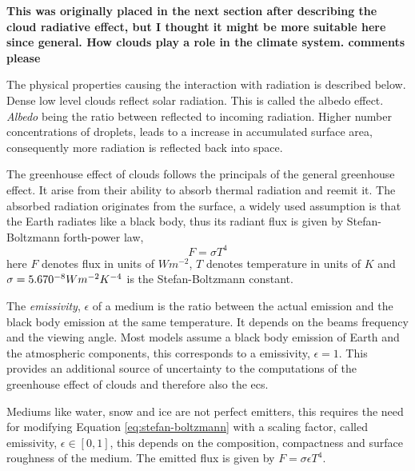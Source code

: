 \textbf{This was originally placed in the next section after describing the cloud radiative effect, but I thought it might be more suitable here since general. How clouds play a role in the climate system. comments please}

The physical properties causing the interaction with radiation is described below. Dense low level clouds reflect solar radiation. This is called the albedo effect. \textit{Albedo} being the ratio between reflected to incoming radiation. Higher number concentrations of droplets, leads to a increase in accumulated surface area, consequently more radiation is reflected back into space. 

The greenhouse effect of clouds follows the  principals of the general greenhouse effect. It arise from their ability to absorb thermal radiation and reemit it. The absorbed radiation originates from the surface, a widely used assumption is that the Earth radiates like a black body, thus its radiant flux is given by Stefan-Boltzmann forth-power law, 
\begin{equation} \label{eq:stefan-boltzmann}
    F = \sigma  T ^4 %
\end{equation}
here $F$ denotes flux in units of $W m^{-2}$, $T$ denotes temperature in units of $K$ and \\  $\sigma = 5.670 \time 10^{-8} W m^{-2} K^{-4}$ is the Stefan-Boltzmann constant. 

The \textit{emissivity}, $\epsilon$ of a medium is the ratio between the actual emission and the black body emission at the same temperature. It depends on the beams frequency and the viewing angle. Most models assume a black body emission of Earth and the atmospheric components, this corresponds to a emissivity, $\epsilon=1$. This provides an additional source of uncertainty to the computations of the greenhouse effect of clouds and therefore also the \acrshort{ecs}.

Mediums like water, snow and ice are not perfect emitters, this requires the need for modifying Equation \eqref{eq:stefan-boltzmann} with a scaling factor, called emissivity, $\epsilon \in [0, 1]$, this depends on the composition, compactness and surface roughness of the medium. The emitted flux is given by $ F = \sigma \epsilon T ^4$. 

